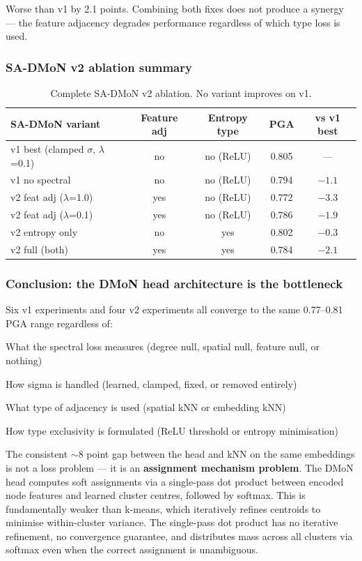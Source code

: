Worse than v1 by 2.1 points. Combining both fixes does not produce a synergy --- the feature adjacency degrades performance regardless of which type loss is used.


\subsubsection{SA-DMoN v2 ablation summary}

\begin{table}[H]
\centering
\footnotesize
\begin{tabular}{lcccc}
\toprule
SA-DMoN variant & Feature adj & Entropy type & PGA & vs v1 best \\
\midrule
v1 best (clamped $\sigma$, $\lambda$=0.1) & no & no (ReLU) & 0.805 & --- \\
v1 no spectral & no & no (ReLU) & 0.794 & $-1.1$ \\
v2 feat adj ($\lambda$=1.0) & yes & no (ReLU) & 0.772 & $-3.3$ \\
v2 feat adj ($\lambda$=0.1) & yes & no (ReLU) & 0.786 & $-1.9$ \\
v2 entropy only & no & yes & 0.802 & $-0.3$ \\
v2 full (both) & yes & yes & 0.784 & $-2.1$ \\
\bottomrule
\end{tabular}
\caption{Complete SA-DMoN v2 ablation. No variant improves on v1.}
\end{table}


\subsubsection{Conclusion: the DMoN head architecture is the bottleneck}

Six v1 experiments and four v2 experiments all converge to the same 0.77--0.81 PGA range regardless of:
\begin{compactitem}
  \item What the spectral loss measures (degree null, spatial null, feature null, or nothing)
  \item How sigma is handled (learned, clamped, fixed, or removed entirely)
  \item What type of adjacency is used (spatial kNN or embedding kNN)
  \item How type exclusivity is formulated (ReLU threshold or entropy minimisation)
\end{compactitem}

The consistent $\sim$8 point gap between the head and kNN on the same embeddings is not a loss problem --- it is an \textbf{assignment mechanism problem}. The DMoN head computes soft assignments via a single-pass dot product between encoded node features and learned cluster centres, followed by softmax. This is fundamentally weaker than k-means, which iteratively refines centroids to minimise within-cluster variance. The single-pass dot product has no iterative refinement, no convergence guarantee, and distributes mass across all clusters via softmax even when the correct assignment is unambiguous.

